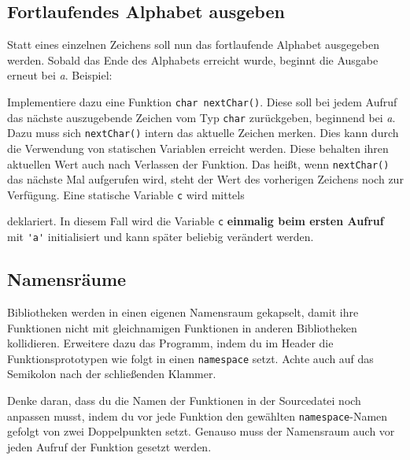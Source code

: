 \subsection{Fortlaufendes Alphabet ausgeben}
Statt eines einzelnen Zeichens soll nun das fortlaufende Alphabet ausgegeben werden.
Sobald das Ende des Alphabets erreicht wurde, beginnt die Ausgabe erneut bei \emph{a}.
Beispiel:

  

Implementiere dazu eine Funktion \lstinline{char nextChar()}.
Diese soll bei jedem Aufruf das nächste auszugebende Zeichen vom Typ \lstinline{char} zurückgeben, beginnend bei \emph{a}.
Dazu muss sich \lstinline{nextChar()} intern das aktuelle Zeichen merken.
Dies kann durch die Verwendung von statischen Variablen erreicht werden. Diese behalten ihren aktuellen Wert auch nach Verlassen der Funktion. Das heißt, wenn \lstinline{nextChar()} das nächste Mal aufgerufen wird, steht der Wert des vorherigen Zeichens noch zur Verfügung.
Eine statische Variable \lstinline{c} wird mittels

  

deklariert.
In diesem Fall wird die Variable \lstinline{c} \textbf{einmalig beim ersten Aufruf} mit \lstinline{'a'} initialisiert und kann später beliebig verändert werden.


\subsection{Namensräume}
Bibliotheken werden in einen eigenen Namensraum gekapselt, damit ihre Funktionen nicht mit gleichnamigen Funktionen in anderen Bibliotheken kollidieren.
Erweitere dazu das Programm, indem du im Header die Funktionsprototypen wie
folgt in einen \lstinline{namespace} setzt. Achte auch auf das Semikolon nach der schließenden Klammer.

  

Denke daran, dass du die Namen der Funktionen in der Sourcedatei noch anpassen musst, indem du vor jede Funktion den gewählten \lstinline{namespace}-Namen gefolgt von zwei Doppelpunkten setzt.
Genauso muss der Namensraum auch vor jeden Aufruf der Funktion gesetzt werden.

